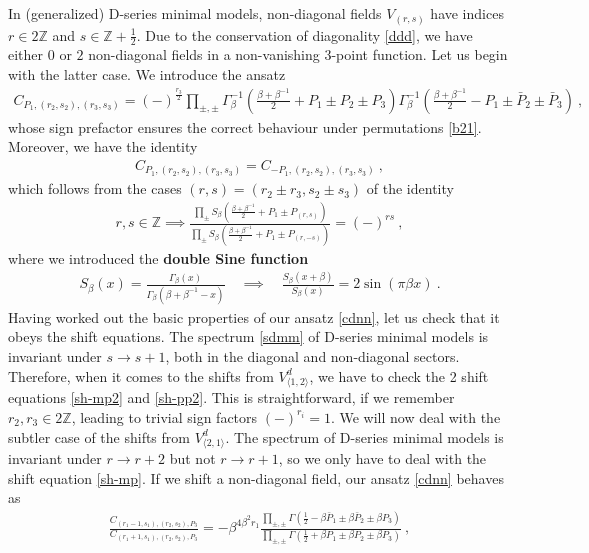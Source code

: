 \documentclass[12pt, a4paper]{article}
\newcommand{\myindex}[1]{\textbf{\boldmath #1}}
\begin{document}
In (generalized) D-series minimal models, non-diagonal fields $V_{(r,s)}$ have indices $r\in 2\mathbb{Z}$ and $s\in\mathbb{Z}+\frac12$.
Due to the conservation of diagonality \eqref{ddd}, we have either $0$ or $2$ non-diagonal fields in a non-vanishing 3-point function. Let us begin with the latter case. We introduce the ansatz 
\begin{align}
 \boxed{C_{P_1,(r_2,s_2),(r_3,s_3)} = (-)^{\frac{r_3}{2}}\prod_{\pm,\pm}
 \Gamma_\beta^{-1}\left(\tfrac{\beta+\beta^{-1}}{2}+P_1 \pm P_2\pm P_3\right) 
 \Gamma_\beta^{-1}\left(\tfrac{\beta+\beta^{-1}}{2}-P_1 \pm \bar P_2\pm \bar P_3\right)}\ ,
 \label{cdnn}
\end{align}
whose sign prefactor ensures the correct behaviour under permutations \eqref{b21}. Moreover, we have the identity
\begin{align}
 C_{P_1,(r_2,s_2),(r_3,s_3)}=C_{-P_1,(r_2,s_2),(r_3,s_3)} \ ,
 \label{cpcmp}
\end{align}
which follows from the cases $(r,s)=(r_2\pm r_3,s_2\pm s_3)$ of the identity 
\begin{align}
 r,s\in\mathbb{Z} \implies \frac{\prod_\pm S_\beta\left(\frac{\beta+\beta^{-1}}{2} +P_1 \pm P_{(r,s)}\right)}{\prod_\pm S_\beta\left(\frac{\beta+\beta^{-1}}{2} +P_1 \pm P_{(r,-s)}\right)} =(-)^{rs}\ ,
 \label{dsr}
\end{align}
where we introduced the \myindex{double Sine function}
\begin{align}
 S_\beta(x) = \frac{\Gamma_\beta(x)}{\Gamma_\beta(\beta + \beta^{-1}-x)}\quad \implies \quad \frac{S_\beta(x+\beta)}{S_\beta(x)} = 2\sin(\pi\beta x)\ .
 \label{sb}
\end{align}
Having worked out the basic properties of our ansatz \eqref{cdnn}, let us check that it obeys the shift equations. The spectrum \eqref{sdmm} of D-series minimal models is invariant under $s\to s+1$, both in the diagonal and non-diagonal sectors. Therefore, when it comes to the shifts from $V^d_{\langle 1,2\rangle}$, we have to check the 2 shift equations \eqref{sh-mp2} and \eqref{sh-pp2}. This is straightforward, if we remember $r_2,r_3\in 2\mathbb{Z}$, leading to trivial sign factors $(-)^{r_i}=1$. We will now deal with the subtler case of the shifts from $V^d_{\langle 2,1\rangle}$. The spectrum of D-series minimal models is invariant under $r\to r+2$ but not $r\to r+1$, so we only have to deal with the shift equation \eqref{sh-mp}. If we shift a non-diagonal field, our ansatz \eqref{cdnn} behaves as
\begin{align}
 \frac{C_{(r_1-1,s_1),(r_2,s_2),P_3}}{C_{(r_1+1,s_1),(r_2,s_2),P_3}} = - \beta^{4\beta^2r_1}\frac{\prod_{\pm,\pm} \Gamma(\frac12-\beta \bar P_1\pm \beta\bar P_2\pm \beta P_3)}{\prod_{\pm,\pm} \Gamma(\frac12+\beta P_1\pm \beta P_2\pm \beta P_3)}\ , 
\end{align}
\end{document}
